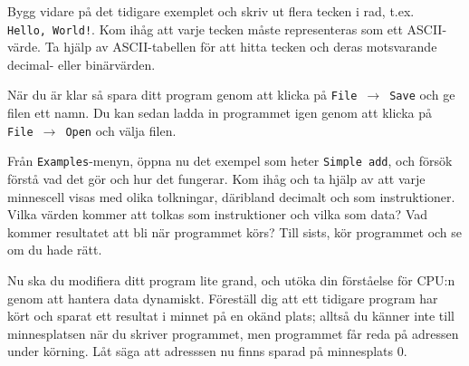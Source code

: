 \begin{Datorarbete}
    \item Bygg vidare på det tidigare exemplet och skriv ut flera tecken i rad, t.ex. \texttt{Hello,~World!}. Kom ihåg att varje tecken måste representeras som ett ASCII-värde. Ta hjälp av ASCII-tabellen för att hitta tecken och deras motsvarande decimal- eller binärvärden.

    \noindent När du är klar så spara ditt program genom att klicka på \texttt{File}~$\rightarrow$~\texttt{Save} och ge filen ett namn. Du kan sedan ladda in programmet igen genom att klicka på \texttt{File}~$\rightarrow$~\texttt{Open} och välja filen.
    \vspace{-2mm}

    \item Från \texttt{Examples}-menyn, öppna nu det exempel som heter \texttt{Simple~add}, och försök förstå vad det gör och hur det fungerar. Kom ihåg och ta hjälp av att varje minnescell visas med olika tolkningar, däribland decimalt och som instruktioner. Vilka värden kommer att tolkas som instruktioner och vilka som data? Vad kommer resultatet att bli när programmet körs? Till sists, kör programmet och se om du hade rätt.
    
    \item Nu ska du modifiera ditt program lite grand, och utöka din förståelse för CPU:n genom att hantera data dynamiskt. Föreställ dig att ett tidigare program har kört och sparat ett resultat i minnet på en okänd plats; alltså du känner inte till minnesplatsen när du skriver programmet, men programmet får reda på adressen under körning. Låt säga att adresssen nu finns sparad på minnesplats 0.


\end{Datorarbete}
